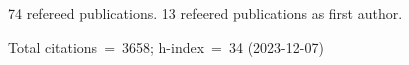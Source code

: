 74 refereed publications. 13 refeered publications as first author.

Total citations~=~3658; h-index~=~34 (2023-12-07)